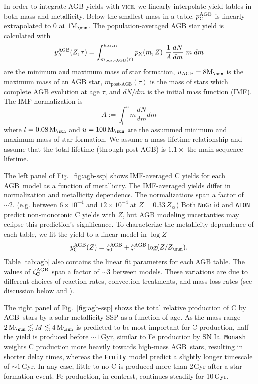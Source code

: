 \documentclass[fleqn,
referee, %
usenatbib]{mnras}
\newcommand{\JJ}{\citetalias{james+21}}
\newcommand{\VICE}{\textsc{vice}}
\newcommand{\fruity}{\texttt{\hyperlink{fruity}{Fruity}}}
\newcommand{\nugrid}{\texttt{\hyperlink{nugrid}{NuGrid}}}
\newcommand{\monash}{\texttt{\hyperlink{monash}{Monash}}}
\newcommand{\aton}{\texttt{\hyperlink{aton}{ATON}}}
\newcommand{\agb}{AGB}
\newcommand{\ia}{SN Ia}
\newcommand{\ycagb}{\y_{\rm C}^{\rm AGB}}
\newcommand{\zagb}{\zeta_{\rm C}^{\rm AGB}}
\newcommand{\y}{p}
\newcommand{\zetao}{\zeta_0}
\newcommand{\zetai}{\zeta_{1}}
\newcommand{\Mo}{ {\rm M}_{\sun}}
\newcommand{\Zo}{ Z_{\sun}}
\newcommand{\about}[1]{${\sim} #1$}
\begin{document}
In order to integrate AGB yields with \VICE, we linearly interpolate yield tables in both mass and metallicity. Below the smallest mass in a table, $\ycagb$ is linearly extrapolated to 0 at $1\Mo$. The population-averaged AGB star yield is calculated with 
\begin{equation} \label{eq:imf-agb-yield}
    y_{X}^{\rm AGB}(Z,\tau) = 
    \int^{u_{\rm AGB}}_{m_\textrm{post-AGB}(\tau)} 
    \y_{\rm X}(m, Z)\ 
    \frac{1}{A}\frac{dN}{dm}\ m\ dm
\end{equation}
are the minimum and maximum mass of star formation, $u_{\rm AGB}=8\Mo$ is the maximum mass of an AGB star, $m_\textrm{post-AGB}(\tau)$ is the mass of stars which complete AGB evolution at age $\tau$, and $dN/dm$ is the initial mass function (IMF). The IMF normalization is
\begin{equation} \label{eq:imf_normalization}
    A := \int_l^u m \frac{dN}{dm} dm
\end{equation}
    where  $l=0.08\,\Mo$ and $u = 100\,\Mo$ are the assummed minimum and maximum mass of star formation. We assume a \citet{larson74} mass-lifetime-relationship and assume that the total lifetime (through post-AGB) is $1.1\times$ the main sequence lifetime.


The left panel of Fig.~\ref{fig:agb-ssp} shows IMF-averaged C yields for each \agb\ model as a function of metallicity.
The IMF-averaged yields differ in normalization and metallicity dependence.  
The normalizations span a factor of \about{2}. (e.g. between $6\times 10^{-4}$ and $12 \times 10^{-4}$ at $Z=0.33\,\Zo$)
Both \nugrid{} and \aton{} predict non-monotonic C yields with $Z$, but AGB modeling uncertanties may eclipse this prediction's significance. To characterize the metallicity dependence of each table, we fit the yield to a linear model in $\log Z$
\begin{equation}\label{eq:agb_z_approx}
    y_{\rm C}^{\rm AGB}(Z) = \zetao^{\rm AGB} + \zetai^{\rm AGB} \log(Z / \Zo).
\end{equation}
Table \ref{tab:agb} also contains the linear fit parameters for each AGB table.
The values of $\zagb$ span a factor of $\sim{3}$ between models.
These variations are due to different choices of reaction rates, convection treatments, and mass-loss rates (see discussion below and \JJ). 



The right panel of Fig.~\ref{fig:agb-ssp} shows the total relative production of C by \agb\ stars by a solar metallicity SSP as a function of age.
As the mass range $2\,\Mo\lesssim M \lesssim 4\,\Mo$ is predicted to be most important for C production, half the yield is produced before \about{1}\,Gyr, similar to Fe production by \ia. 
\monash{} weights C production more heavily towards high-mass \agb\ stars, resulting in shorter delay times, whereas the \fruity\ model predict a slightly longer timescale of \about{1}\,Gyr. In any case, little to no C is produced more than 2\,Gyr after a star formation event. Fe production, in contrast, continues steadily for 10\,Gyr. 
\end{document}
